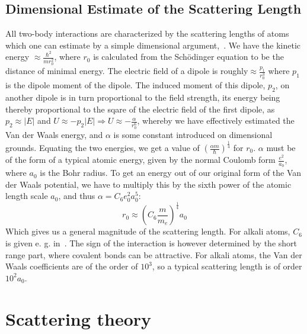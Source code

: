 \subsection{Dimensional Estimate of the Scattering Length}
All two-body interactions are characterized by the scattering lengths of atoms which one can estimate by a simple dimensional argument,~\cite{pethick}. 
We have the kinetic energy $\approx\frac{\hbar^2}{mr_0^2}$, where $r_0$ is calculated from the Sch\"odinger equation to be the distance of minimal energy. 
The electric field of a dipole is roughly$\approx\frac{p_1}{r_0^3}$ where $p_1$ is the dipole moment of the dipole. The induced moment of this dipole, $p_2$, 
on another dipole is in turn proportional to the field strength, its energy being thereby proportional to the sqare of the electric field of the first dipole, 
as $p_2\approx|E|$ and $U\approx - p_2|E|\Rightarrow U\approx - \frac{\alpha}{r_0^6}$, whereby we have effectively estimated the Van der Waals energy, and $\alpha$ 
is some constant introduced on dimensional grounds. Equating the two energies, we get a value of $(\frac{\alpha m}{\hbar})^{\frac{1}{4}}$ for $r_0$. $\alpha$ must be 
of the form of a typical atomic energy, given by the normal Coulomb form $\frac{e^2}{a_0}$, where $a_0$ is the Bohr radius. To get an energy out of our original form 
of the Van der Waals potential, we have to multiply this by the sixth power of the atomic length scale $a_0$, and thus $\alpha=C_6e_0^2a_0^5$: 
\begin{equation}\label{eq:scattering}
	r_0\approx\left( C_6\frac{m}{m_e}\right)^{\frac{1}{4}}a_0
\end{equation}
Which gives us a general magnitude of the scattering length. For alkali atoms, $C_6$ is given e. g. in~\cite{derevianko}. The sign of the interaction is however 
determined by the short range part, where covalent bonds can be attractive. For alkali atoms, the Van der Waals coefficients are of the order of $10^3$, so a typical
scattering length is of order $10^2a_0$. 

\section{Scattering theory}
